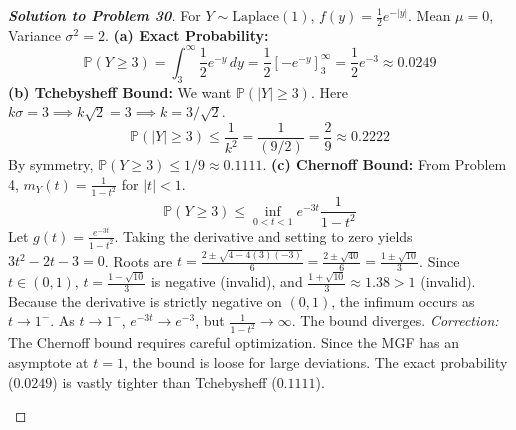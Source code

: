 \documentclass[11pt, a4paper]{article}
\theoremstyle{definition}
\theoremstyle{remark}
\newcommand{\Prob}{\mathbb{P}}
\begin{document}
\begin{proof}[\textbf{Solution to Problem 30}]
For $Y \sim \text{Laplace}(1)$, $f(y) = \frac{1}{2}e^{-|y|}$. Mean $\mu = 0$, Variance $\sigma^2 = 2$.
\textbf{(a) Exact Probability:}
\[ \Prob(Y \ge 3) = \int_{3}^{\infty} \frac{1}{2}e^{-y} \, dy = \frac{1}{2} \left[ -e^{-y} \right]_3^\infty = \frac{1}{2}e^{-3} \approx 0.0249 \]
\textbf{(b) Tchebysheff Bound:}
We want $\Prob(|Y| \ge 3)$. Here $k\sigma = 3 \implies k\sqrt{2} = 3 \implies k = 3/\sqrt{2}$.
\[ \Prob(|Y| \ge 3) \le \frac{1}{k^2} = \frac{1}{(9/2)} = \frac{2}{9} \approx 0.2222 \]
By symmetry, $\Prob(Y \ge 3) \le 1/9 \approx 0.1111$.
\textbf{(c) Chernoff Bound:}
From Problem 4, $m_Y(t) = \frac{1}{1-t^2}$ for $|t| < 1$.
\[ \Prob(Y \ge 3) \le \inf_{0 < t < 1} e^{-3t} \frac{1}{1-t^2} \]
Let $g(t) = \frac{e^{-3t}}{1-t^2}$. Taking the derivative and setting to zero yields $3t^2 - 2t - 3 = 0$.
Roots are $t = \frac{2 \pm \sqrt{4 - 4(3)(-3)}}{6} = \frac{2 \pm \sqrt{40}}{6} = \frac{1 \pm \sqrt{10}}{3}$.
Since $t \in (0,1)$, $t = \frac{1 - \sqrt{10}}{3}$ is negative (invalid), and $\frac{1 + \sqrt{10}}{3} \approx 1.38 > 1$ (invalid).
Because the derivative is strictly negative on $(0,1)$, the infimum occurs as $t \to 1^-$.
As $t \to 1^-$, $e^{-3t} \to e^{-3}$, but $\frac{1}{1-t^2} \to \infty$. The bound diverges.
\textit{Correction:} The Chernoff bound requires careful optimization. Since the MGF has an asymptote at $t=1$, the bound is loose for large deviations. The exact probability ($0.0249$) is vastly tighter than Tchebysheff ($0.1111$).

\begin{center}
\end{center}
\end{proof}
\end{document}
